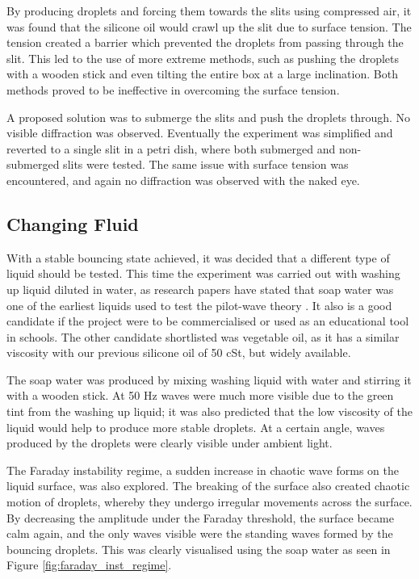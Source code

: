 By producing droplets and forcing them towards the slits using compressed air, it was found that the silicone oil would crawl up the slit due to surface tension. The tension created a barrier which prevented the droplets from passing through the slit. This led to the use of more extreme methods, such as pushing the droplets with a wooden stick and even tilting the entire box at a large inclination. Both methods proved to be ineffective in overcoming the surface tension.

A proposed solution was to submerge the slits and push the droplets through. No visible diffraction was observed. Eventually the experiment was simplified and reverted to a single slit in a petri dish, where both submerged and non-submerged slits were tested. The same issue with surface tension was encountered, and again no diffraction was observed with the naked eye.

\subsection{Changing Fluid}
With a stable bouncing state achieved, it was decided that a different type of liquid should be tested. This time the experiment was carried out with washing up liquid diluted in water, as research papers have stated that soap water was one of the earliest liquids used to test the pilot-wave theory \cite{protiere2006particle}. It also is a good candidate if the project were to be commercialised or used as an educational tool in schools. The other candidate shortlisted was vegetable oil, as it has a similar viscosity with our previous silicone oil of 50 cSt, but widely available.

The soap water was produced by mixing washing liquid with water and stirring it with a wooden stick. At 50 Hz waves were much more visible due to the green tint from the washing up liquid; it was also predicted that the low viscosity of the liquid would help to produce more stable droplets. At a certain angle, waves produced by the droplets were clearly visible under ambient light.

The Faraday instability regime, a sudden increase in chaotic wave forms on the liquid surface, was also explored. The breaking of the surface also created chaotic motion of droplets, whereby they undergo irregular movements across the surface. By decreasing the amplitude under the Faraday threshold, the surface became calm again, and the only waves visible were the standing waves formed by the bouncing droplets. This was clearly visualised using the soap water as seen in Figure \ref{fig:faraday_inst_regime}.

